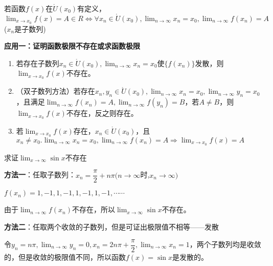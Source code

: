\begin{theorem}[海涅定理] \label{thm:henie_theorem}
    若函数$f(x)$在$\mathring{U}(x_0)$有定义，$\displaystyle\lim_{x\rightarrow x_0} f(x)=A\in R \Leftrightarrow \forall x_n \in \mathring{U}(x_0),\lim_{n\rightarrow\infty}x_n=x_0,\lim_{n\rightarrow\infty}f(x_n)=A$($x_n$是子数列)
\end{theorem}

\textbf{应用一：证明函数极限不存在或求函数极限}
\begin{enumerate}
    \item 若存在子数列$x_n\in\mathring{U}(x_0),\displaystyle\lim_{n\rightarrow\infty}x_n=x_0$使$\{f(x_n)\}$发散，则$\displaystyle\lim_{x\rightarrow x_0}f(x)$不存在。

    \item （双子数列方法）若存在$x_n,y_n\in\mathring{U}(x_0),\displaystyle\lim_{n\rightarrow\infty}x_n=x_0,\lim_{n\rightarrow\infty}y_n=x_0$，且满足$\displaystyle\lim_{n\rightarrow\infty}f(x_n)=A,\lim_{n\rightarrow\infty}f(y_n)=B$，若$A\neq B$，则$\displaystyle\lim_{x\rightarrow x_0}f(x)$不存在，反之则存在。

    \item 若$\displaystyle\lim_{x\rightarrow x_0}f(x)$存在，$x_n\in\mathring{U}(x_0)$，且$x_n\neq x_0.\displaystyle\lim_{n\rightarrow\infty}x_n=x_0,\lim_{n\rightarrow\infty}f(x_n)=A\Rightarrow\lim_{x\rightarrow x_0}f(x)=A$
\end{enumerate}
\vspace{2mm}

\begin{example}
    求证$\displaystyle\lim_{x\rightarrow\infty}\sin x$不存在
\end{example}

\begin{solution}
    \textbf{方法一}：任取子数列：$x_n=\dfrac{\pi}{2}+n\pi(n\rightarrow\infty$时,$x_n\rightarrow\infty)$

    $f(x_n)=1,-1,1,-1,1,-1,1,-1,\cdots\cdots$

    由于$\displaystyle\lim_{n\rightarrow\infty}f(x_n)$不存在，所以$\displaystyle\lim_{x\rightarrow\infty}\sin x$不存在。
    \vspace{4mm}

    \textbf{方法二}：任取两个收敛的子数列，但是可证出极限值不相等——发散

    令$y_n=n\pi,\displaystyle\lim_{n\rightarrow\infty}y_n=0,x_n=2n\pi+\dfrac{\pi}{2},\lim_{n\rightarrow\infty}x_n=1$，两个子数列均是收敛的，但是收敛的极限值不同，所以函数$f(x)=\sin x$是发散的。
\end{solution}
\vspace{2mm}

